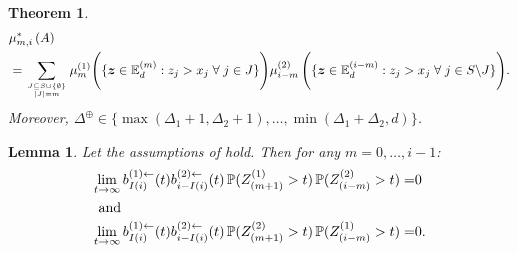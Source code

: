 \documentclass[10pt,a4paper]{amsart}
\newtheorem{theorem}{Theorem}
\newtheorem{lemma}{Lemma}
\newcommand{\E}{\mathbb{E}}
\renewcommand\P{\mathbb{P}}
\def\bz{\boldsymbol z}
\begin{document}
\begin{theorem}
 \begin{align*}
        &\mu_{m,i}^*\left(A\right)\\
         &=\sum_{\genfrac{}{}{0pt}{}{J\subseteq S\cup \{\emptyset\}}{|J|=m}} \mu_{m}^{(1)}\Bigg(\{\bz\in\E_d^{(m)}: z_{j}>x_{j}\;\forall\;j\in J\}\Bigg)
        \mu_{i-m}^{(2)}\,\Bigg(\{\bz\in\E_d^{(i-m)}:  z_{j}>x_{j}\;\forall\; j\in S\backslash J\}\Bigg).
 \end{align*}
 Moreover, $\Delta^{\oplus} \in \{\max(\Delta_1+1,\Delta_2+1), \ldots, \min(\Delta_1+\Delta_2,d)\}$.
 \end{theorem}

\begin{lemma} \label{Lemma 4.2}
Let the assumptions of  hold. Then for any
$m=0,\ldots,i-1$:
\begin{align}
    \lim_{t\to\infty}b_{I(i)}^{(1)\leftarrow}(t)b_{i-I(i)}^{(2)\leftarrow}(t)\,\P(Z_{(m+1)}^{(1)}>t)\,\P(Z_{(i-m)}^{(2)}>t)=& 0 \label{appeq:B1}\\ \intertext{ and }
   { \lim_{t\to\infty}b_{I(i)}^{(1)\leftarrow}(t)b_{i-I(i)}^{(2)\leftarrow}(t)\,\P(Z_{(m+1)}^{(2)}>t)\,\P(Z_{(i-m)}^{(1)}>t)}=& 0. \label{appeq:B2}
\end{align}
\end{lemma}
\end{document}
